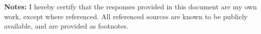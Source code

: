 %
%
\textbf{Notes:}
I hereby certify that the responses provided in this document are my own work, except where referenced. All referenced sources are known to be publicly available, and are provided as footnotes.
